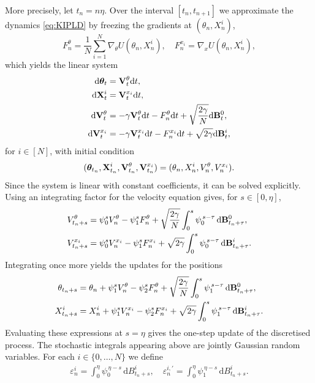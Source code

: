 More precisely, let $t_n=n\eta$. Over the interval $[t_n,t_{n+1}]$ we approximate the dynamics \eqref{eq:KIPLD} by freezing the gradients at $(\theta_n,X_n^i)$,
\[
F_n^\theta = \frac{1}{N}\sum_{i=1}^N \nabla_\theta U(\theta_n,X_n^i),
\quad
F_n^{x_i} = \nabla_x U(\theta_n,X_n^i),
\]
which yields the linear system
\begin{align*}
\mathrm{d}\bm{\theta}_t &= {\mathbf V}_t^\theta \mathrm{d}t, \\
\mathrm{d}{\mathbf X}_t^i &= {\mathbf V}_t^{x_i} \mathrm{d}t,\\
\mathrm{d}{\mathbf V}_t^\theta &= -\gamma {\mathbf V}_t^\theta \mathrm{d}t - F_n^\theta \mathrm{d}t
+ \sqrt{\frac{2\gamma}{N}}\mathrm{d}{\mathbf B}_t^0,\\
\mathrm{d}{\mathbf V}_t^{x_i} &= -\gamma {\mathbf V}_t^{x_i} \mathrm{d}t - F_n^{x_i} \mathrm{d}t
+ \sqrt{2\gamma}\mathrm{d}{\mathbf B}_t^i,
\end{align*}
for $i\in[N]$, with initial condition
\[
(\bm{\theta}_{t_n},{\mathbf X}_{t_n}^i,{\mathbf V}_{t_n}^\theta,{\mathbf V}_{t_n}^{x_i})
=
(\theta_n,X_n^i,V_n^\theta,V_n^{x_i}).
\]
Since the system is linear with constant coefficients, it can be solved explicitly. Using an integrating factor for the velocity equation gives, for $s\in[0,\eta]$,
\small
\begin{align*}
V_{t_n+s}^\theta
&= \psi_0^s V_n^\theta - \psi_1^s F_n^\theta
+ \sqrt{\frac{2\gamma}{N}}
\int_0^s \psi_0^{\,s-\tau}\,\mathrm{d}{\mathbf B}_{t_n+\tau}^0,\\
V_{t_n+s}^{x_i}
&= \psi_0^s V_n^{x_i} - \psi_1^s F_n^{x_i}
+ \sqrt{2\gamma}
\int_0^s \psi_0^{\,s-\tau}\,\mathrm{d}{\mathbf B}_{t_n+\tau}^i.
\end{align*}
\normalsize
Integrating once more yields the updates for the positions
\small
\begin{align*}
\theta_{t_n+s}
&= \theta_n + \psi_1^s V_n^\theta - \psi_2^s F_n^\theta
+ \sqrt{\frac{2\gamma}{N}}
\int_0^s \psi_1^{\,s-\tau}\,\mathrm{d}{\mathbf B}_{t_n+\tau}^0,\\
X_{t_n+s}^i
&= X_n^i + \psi_1^s V_n^{x_i} - \psi_2^s F_n^{x_i}
+ \sqrt{2\gamma}
\int_0^s \psi_1^{\,s-\tau}\,\mathrm{d}{\mathbf B}_{t_n+\tau}^i.
\end{align*}
\normalsize
Evaluating these expressions at $s=\eta$ gives the one-step update of the discretised process. The stochastic integrals appearing above are jointly Gaussian random variables. For each $i\in\{0,\ldots,N\}$ we define
\begin{align*}
\varepsilon_n^i = \int_0^\eta \psi_0^{\,\eta-s}\,\mathrm{d}B_{t_n+s}^i, \quad \varepsilon_n^{i,\prime} = \int_0^\eta \psi_1^{\,\eta-s}\,\mathrm{d}B_{t_n+s}^i.
\end{align*}
